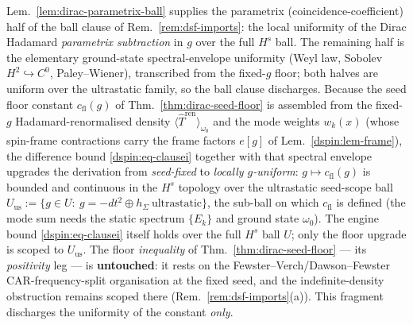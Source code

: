 \begin{remark}\label{dspin:rem-floor}
Lem.~\ref{lem:dirac-parametrix-ball} supplies the parametrix
(coincidence-coefficient) half of the ball clause of
Rem.~\ref{rem:dsf-imports}: the local uniformity of the Dirac Hadamard
\emph{parametrix subtraction} in $g$ over the full $H^s$ ball. The
remaining half is the elementary ground-state spectral-envelope
uniformity (Weyl law, Sobolev $H^2\hookrightarrow C^0$, Paley--Wiener),
transcribed from the fixed-$g$ floor; both halves are uniform over the
ultrastatic family, so the ball clause discharges. Because the seed
floor constant $c_{\mathrm{fl}}(g)$ of Thm.~\ref{thm:dirac-seed-floor} is
assembled from the fixed-$g$ Hadamard-renormalised density
$\langle\widehat T^{\mathrm{ren}}\rangle_{\omega_0}$ and the mode weights
$w_k(x)$ (whose spin-frame contractions carry the frame factors $e[g]$ of
Lem.~\ref{dspin:lem-frame}), the difference bound \eqref{dspin:eq-clausei}
together with that spectral envelope upgrades the derivation from
\emph{seed-fixed} to \emph{locally $g$-uniform}: $g\mapsto c_{\mathrm{fl}}(g)$
is bounded and continuous in the $H^s$ topology over the ultrastatic
seed-scope ball $U_{\mathrm{us}}:=\{g\in U:\ g=-dt^2\oplus h_\Sigma\ \text{ultrastatic}\}$,
the sub-ball on which $c_{\mathrm{fl}}$ is defined (the mode sum needs the
static spectrum $\{E_k\}$ and ground state $\omega_0$). The engine bound
\eqref{dspin:eq-clausei} itself holds over the full $H^s$ ball $U$; only the
floor upgrade is scoped to $U_{\mathrm{us}}$. The floor \emph{inequality} of
Thm.~\ref{thm:dirac-seed-floor} --- its \emph{positivity} leg --- is
\textbf{untouched}: it rests on the Fewster--Verch/Dawson--Fewster
CAR-frequency-split organisation at the fixed seed, and the indefinite-density
obstruction remains scoped there (Rem.~\ref{rem:dsf-imports}(a)). This fragment
discharges the uniformity of the constant \emph{only}.
\end{remark}

